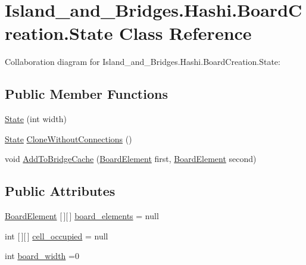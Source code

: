 \hypertarget{class_island__and___bridges_1_1_hashi_1_1_board_creation_1_1_state}{}\section{Island\+\_\+and\+\_\+\+Bridges.\+Hashi.\+Board\+Creation.\+State Class Reference}
\label{class_island__and___bridges_1_1_hashi_1_1_board_creation_1_1_state}


Collaboration diagram for Island\+\_\+and\+\_\+\+Bridges.\+Hashi.\+Board\+Creation.\+State\+:
\subsection*{Public Member Functions}
\begin{DoxyCompactItemize}
\item 
\mbox{\hyperlink{class_island__and___bridges_1_1_hashi_1_1_board_creation_1_1_state_abc94d7d07a1564af54a7436467e27b8c}{State}} (int width)
\item 
\mbox{\hyperlink{class_island__and___bridges_1_1_hashi_1_1_board_creation_1_1_state}{State}} \mbox{\hyperlink{class_island__and___bridges_1_1_hashi_1_1_board_creation_1_1_state_aa2351260cc2f36ae8a54bc45540c0a49}{Clone\+Without\+Connections}} ()
\item 
void \mbox{\hyperlink{class_island__and___bridges_1_1_hashi_1_1_board_creation_1_1_state_affdb44afe2471c997e755ffe173720cf}{Add\+To\+Bridge\+Cache}} (\mbox{\hyperlink{class_island__and___bridges_1_1_hashi_1_1_board_element}{Board\+Element}} first, \mbox{\hyperlink{class_island__and___bridges_1_1_hashi_1_1_board_element}{Board\+Element}} second)
\end{DoxyCompactItemize}
\subsection*{Public Attributes}
\begin{DoxyCompactItemize}
\item 
\mbox{\hyperlink{class_island__and___bridges_1_1_hashi_1_1_board_element}{Board\+Element}} \mbox{[}$\,$\mbox{]}\mbox{[}$\,$\mbox{]} \mbox{\hyperlink{class_island__and___bridges_1_1_hashi_1_1_board_creation_1_1_state_a8f7eb53a5068ff602879de6767630eb7}{board\+\_\+elements}} = null
\item 
int \mbox{[}$\,$\mbox{]}\mbox{[}$\,$\mbox{]} \mbox{\hyperlink{class_island__and___bridges_1_1_hashi_1_1_board_creation_1_1_state_a0682db531a8c66573cc92d68cc5a486e}{cell\+\_\+occupied}} = null
\item 
int \mbox{\hyperlink{class_island__and___bridges_1_1_hashi_1_1_board_creation_1_1_state_a9d2eb7ab3f5774c58b3cc7657666b905}{board\+\_\+width}} =0
\end{DoxyCompactItemize}


